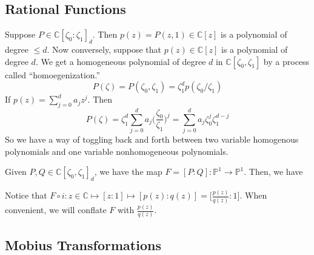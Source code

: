 \subsection{Rational Functions} 

  Suppose $P \in \mathbb{C}[\zeta_0 : \zeta_1]_d$. Then $p(z) = P(z, 1) \in \mathbb{C}[z]$ is a polynomial of degree $\leq d$. Now conversely, suppose that $p(z) \in \mathbb{C}[z]$ is a polynomial of degree $d$. We get a homogeneous polynomial of degree $d$ in $\mathbb{C}[\zeta_0, \zeta_1]$ by a process called ``homoegenization.'' 
  \begin{equation}
    P(\zeta) = P(\zeta_0, \zeta_1) = \zeta_1^d p (\zeta_0 / \zeta_1)
  \end{equation} 
  If $p(z) = \sum_{j=0}^d a_j z^j$. Then
  \begin{equation}
    P(\zeta) = \zeta_1^d \sum_{j=0}^d a_j \Big( \frac{\zeta_0}{\zeta_1} \Big)^j = \sum_{j=0}^d a_j \zeta_0^j \zeta_1^{d-j}
  \end{equation}
  So we have a way of toggling back and forth between two variable homogenous polynomials and one variable nonhomogeneous polynomials. 

  Given $P, Q \in \mathbb{C}[\zeta_0, \zeta_1]_d$, we have the map $F = [P : Q] : \mathbb{P}^1 \to \mathbb{P}^1$. Then, we have 

  \begin{figure}[H]
    \centering 
    \caption{} 
  \end{figure}

  Notice that $F \circ i : z \in \mathbb{C} \mapsto [z : 1] \mapsto [p(z) : q(z)] = \big[ \frac{p(z)}{q(z)} : 1 \big]$. When convenient, we will conflate $F$ with $\frac{p(z)}{q(z)}$. 


\subsection{Mobius Transformations} 

